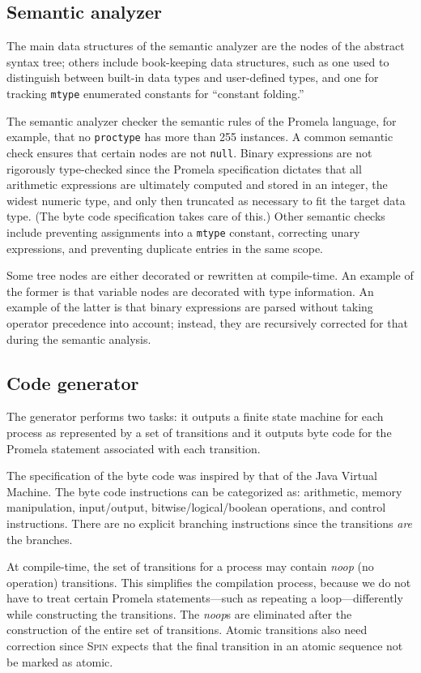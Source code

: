 \documentclass[11pt]{article}
\newcommand*{\spn}{\textsc{Spin}}
\newcommand*{\p}[1]{\texttt{#1}}
\begin{document}
\subsection{Semantic analyzer}

The main data structures of the semantic analyzer are the nodes of the
abstract syntax tree; others include book-keeping data structures, such
as one used to distinguish between built-in data types and user-defined
types, and one for tracking \p{mtype} enumerated constants for
``constant folding.''

The semantic analyzer checker the semantic rules of the Promela
language, for example, that no \p{proctype} has more than 255 instances.
A common semantic check ensures that certain nodes are not \p{null}.
Binary expressions are not rigorously type-checked since the Promela
specification dictates that all arithmetic expressions are ultimately
computed and stored in an integer, the widest numeric type, and only
then truncated as necessary to fit the target data type. (The byte code
specification takes care of this.) Other semantic checks include
preventing assignments into a \p{mtype} constant, correcting unary
expressions, and preventing duplicate entries in the same scope.

Some tree nodes are either decorated or rewritten at compile-time. An
example of the former is that variable nodes are decorated with type
information. An example of the latter is that binary expressions are
parsed without taking operator precedence into account; instead, they are
recursively corrected for that during the semantic analysis.

\subsection{Code generator}

The generator performs two tasks: it outputs a finite state machine for
each process as represented by a set of transitions and it outputs byte
code for the Promela statement associated with each transition.

The specification of the byte code was inspired by that of the Java
Virtual Machine. The byte code instructions can be categorized as:
arithmetic, memory manipulation, input/output, bitwise/logical/boolean
operations, and control instructions. There are no explicit branching
instructions since the transitions \emph{are} the branches.

At compile-time, the set of transitions for a process may contain
\emph{noop} (no operation) transitions. This simplifies the compilation
process, because we do not have to treat certain Promela
statements---such as repeating a loop---differently while constructing
the transitions. The \emph{noop}s are eliminated after the construction
of the entire set of transitions. Atomic transitions also need
correction since \spn{} expects that the final transition in an atomic
sequence not be marked as atomic.
\end{document}
